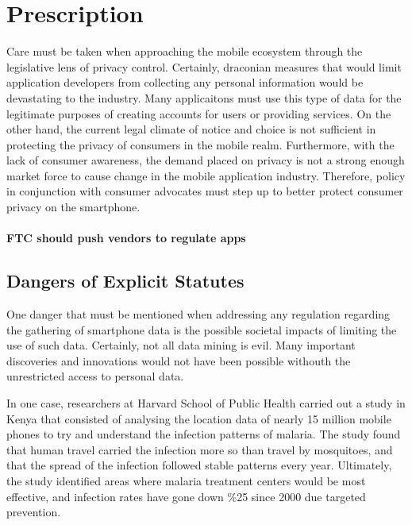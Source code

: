 \section{Prescription}


Care must be taken when approaching the mobile ecosystem through the legislative lens of privacy control. Certainly, draconian measures that would limit application developers from collecting any personal information would be devastating to the industry. Many applicaitons must use this type of data for the legitimate purposes of creating accounts for users or providing services. On the other hand, the current legal climate of notice and choice is not sufficient in protecting the privacy of consumers in the mobile realm. 
Furthermore, with the lack of consumer awareness, the demand placed on privacy is not a strong enough market force to cause change in the mobile application industry. 
Therefore, policy in conjunction with consumer advocates must step up to better protect consumer privacy on the smartphone. 



\paragraph{FTC should push vendors to regulate apps}





	\subsection{Dangers of Explicit Statutes} 

One danger that must be mentioned when addressing any regulation regarding the gathering of smartphone data is the possible societal impacts of limiting the use of such data. Certainly, not all data mining is evil. Many important discoveries and innovations would not have been possible withouth the unrestricted access to personal data. 

In one case, researchers at Harvard School of Public Health carried out a study in Kenya that consisted of analysing the location data of nearly 15 million mobile phones to try and understand the infection patterns of malaria\cite{unlock}. The study found that human travel carried the infection more so than travel by mosquitoes, and that the spread of the infection followed stable patterns every year. Ultimately, the study identified areas where malaria treatment centers would be most effective, and infection rates have gone down \%25 since 2000 due targeted prevention. 


